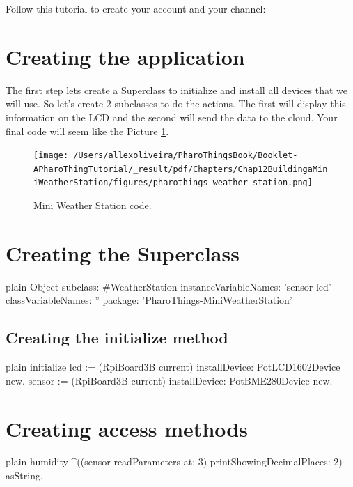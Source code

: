 \documentclass[10pt,twoside,english]{_support/latex/sbabook/sbabook}
\begin{document}
Follow this tutorial to create your account and your channel:

\section{Creating the application}
The first step lets create a Superclass to initialize and install all devices that we will use. So let's create 2 subclasses to do the actions. The first will display this information on the LCD and the second will send the data to the cloud. Your final code will seem like the Picture \ref{MiniWeatherStationcode}.


\begin{figure}

\begin{center}
\texttt{[image: /Users/allexoliveira/PharoThingsBook/Booklet-APharoThingTutorial/\_result/pdf/Chapters/Chap12BuildingaMiniWeatherStation/figures/pharothings-weather-station.png]}\caption{Mini Weather Station code.\label{MiniWeatherStationcode}}\end{center}
\end{figure}

\section{Creating the Superclass}
\begin{displaycode}{plain}
Object subclass: #WeatherStation
    instanceVariableNames: 'sensor lcd'
    classVariableNames: ''
    package: 'PharoThings-MiniWeatherStation'
\end{displaycode}
\subsection{Creating the initialize method}
\begin{displaycode}{plain}
initialize
lcd := (RpiBoard3B current) installDevice: PotLCD1602Device  new.
sensor := (RpiBoard3B current) installDevice: PotBME280Device new. 
\end{displaycode}
\section{Creating access methods}
\begin{displaycode}{plain}
humidity
    ^((sensor readParameters at: 3) printShowingDecimalPlaces: 2) asString. 
\end{displaycode}
\end{document}
